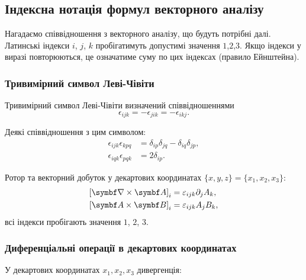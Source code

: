 \subsection{Індексна нотація формул векторного аналізу}\hypertarget{vector-index-notation}{}

Нагадаємо співвідношення з векторного аналізу, що будуть потрібні далі.
Латинські індекси $i$, $j$, $k$ пробігатимуть допустимі значення $1$,$2$,$3$. Якщо індекси
у виразі повторюються, це означатиме суму по цих індексах (правило
Ейнштейна).

\subsubsection{Тривимірний символ Леві-Чівіти}\label{Levi-Chiv}

Тривимірний символ Леві-Чівіти визначений співвідношеннями
\begin{equation}\label{eq:Levi-Chiv}
\epsilon_{ijk} =  - \epsilon_{jik} =  - \epsilon_{ikj}.
\end{equation}

Деякі співвідношення з цим символом:
\begin{align}
    \epsilon_{ijk}\epsilon_{kpq} &= \delta_{ip}\delta_{jq} - \delta_{iq}\delta_{jp}, \\
    \epsilon_{iqk}\epsilon_{pqk} &= 2\delta _{ip}.
\end{align}

Ротор та векторний добуток у декартових координатах $\{x,y,z\} = \{x_1, x_2, x_3\}$:
\begin{align}
\left[\rot\vect{A} \right]_i &= \epsilon_{ijk}{\partial_j}{A_k}, \\
\left[ \vect{A} \times \Bfield \right]_i &= \epsilon_{ijk}{A_j}{B_k},
\end{align}
всі індекси пробігають значення $1$, $2$, $3$.

\subsubsection{Диференціальні операції в декартових координатах}


У декартових координатах \( x_1, x_2, x_3 \) дивергенція:


